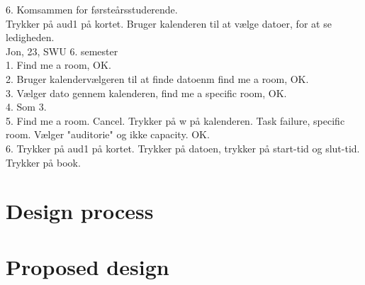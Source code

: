 6. Komsammen for førsteårsstuderende.\\
Trykker på aud1 på kortet. Bruger kalenderen til at vælge datoer, for at se ledigheden.\\




Jon, 23, SWU 6. semester\\

1.
Find me a room, OK. \\


2.
Bruger kalendervælgeren til at finde datoenm find me a room, OK.\\


3.
Vælger dato gennem kalenderen, find me a specific room, OK.\\


4. 
Som 3. \\


5.
Find me a room. Cancel. Trykker på w på kalenderen. Task failure, specific room. Vælger "auditorie" og ikke capacity. OK. \\


6.
Trykker på aud1 på kortet. Trykker på datoen, trykker på start-tid og slut-tid. Trykker på book.

\section{Design process}

\section{Proposed design}
